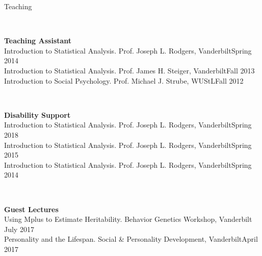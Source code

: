 \begin{rSection}{\textrm{Teaching}}
\begin{minipage}{\linewidth}
\end{minipage}
\medskip\\
\begin{minipage}{\linewidth}{\large {\bf Teaching Assistant}}\\
Introduction to Statistical Analysis. Prof. Joseph L. Rodgers, Vanderbilt\hfill  {Spring 2014}\smallskip\\
Introduction to Statistical Analysis. Prof. James H. Steiger, Vanderbilt\hfill  {Fall 2013}\smallskip\\
Introduction to Social Psychology. Prof. Michael J. Strube, WUStL\hfill{Fall 2012}\end{minipage}\medskip\\
\begin{minipage}{\linewidth}{\large {\bf Disability Support}}\\
Introduction to Statistical Analysis. Prof. Joseph L. Rodgers, Vanderbilt\hfill  {Spring 2018}\smallskip\\
Introduction to Statistical Analysis. Prof. Joseph L. Rodgers, Vanderbilt\hfill  {Spring 2015}\smallskip\\
Introduction to Statistical Analysis. Prof. Joseph L. Rodgers, Vanderbilt\hfill{Spring 2014}\end{minipage}\medskip\\
\begin{minipage}{\linewidth}{\large {\bf Guest Lectures}}\\
Using Mplus to Estimate Heritability. Behavior Genetics Workshop, Vanderbilt \hfill{July 2017}\\
Personality and the Lifespan. Social \& Personality Development, Vanderbilt\hfill {April 2017}\end{minipage}
\end{rSection}

